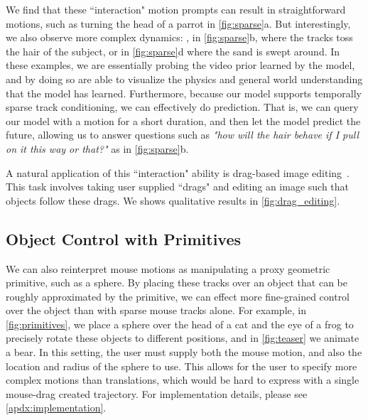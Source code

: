  We find that these ``interaction" motion prompts can result in straightforward motions, such as turning the head of a parrot in \cref{fig:sparse}a. But interestingly, we also observe more complex dynamics: \eg, in \cref{fig:sparse}b, where the tracks toss the hair of the subject, or in \cref{fig:sparse}d where the sand is swept around. In these examples, we are essentially probing the video prior learned by the model, and by doing so are able to visualize the physics and general world understanding that the model has learned. Furthermore, because our model supports temporally sparse track conditioning, we can effectively do prediction. That is, we can query our model with a motion for a short duration, and then let the model predict the future, allowing us to answer questions such as {\it "how will the hair behave if I pull on it this way or that?"} as in \cref{fig:sparse}b.





 A natural application of this ``interaction" ability is drag-based image editing~\cite{pan2023drag,shi2023dragdiffusion,mou2023dragondiffusion,geng2024motion,alzayer2024magic,rotstein2024pathways}. This task involves taking user supplied ``drags" and editing an image such that objects follow these drags.
We shows qualitative results in \cref{fig:drag_editing}.


\subsection{Object Control with Primitives}
\label{sec:primitives}

We can also reinterpret mouse motions as manipulating a proxy geometric primitive, such as a sphere. By placing these tracks over an object that can be roughly approximated by the primitive, we can effect more fine-grained control over the object than with sparse mouse tracks alone. For example, in \cref{fig:primitives}, we place a sphere over the head of a cat and the eye of a frog to precisely rotate these objects to different positions, and in \cref{fig:teaser} we animate a bear. In this setting, the user must supply both the mouse motion, and also the location and radius of the sphere to use.
This allows for the user to specify more complex motions than translations, which would be hard to express with a single mouse-drag created trajectory. 
For implementation details, please see \cref{apdx:implementation}. %

